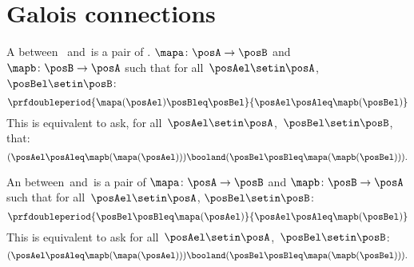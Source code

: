 

\section{Galois connections}\label{subsec:galois-connections}

\begin{ctdefinition}\label{def:monotone-galois-connection}
    A  between ~\posA and~\posB is a pair of .
    $\mapa\colon \posA\to \posB$ and~$\mapb\colon \posB\to \posA$ such that for all~$\posAel\setin \posA$,~$\posBel\setin \posB$:
    \begin{equation}
        \prfdoubleperiod{\mapa(\posAel) \posBleq \posBel}{\posAel \posAleq \mapb(\posBel)}
    \end{equation}
    This is equivalent to ask, for all~$\posAel\setin \posA$,~$\posBel\setin \posB$, that:
    \begin{equation}
        (\posAel\posAleq \mapb(\mapa(\posAel)))
        \booland (\posBel\posBleq \mapa(\mapb(\posBel))).
    \end{equation}
\end{ctdefinition}

\begin{ctdefinition}\label{def:antitone-galois-connection}
    An  between~\posA and~\posB is a pair of  $\mapa\colon \posA\to \posB$ and $\mapb \colon \posB\to \posA$ such that for all~$\posAel\setin \posA$, $\posBel\setin \posB$:
    \begin{equation}
        \prfdoubleperiod{\posBel \posBleq \mapa(\posAel)}{\posAel \posAleq \mapb(\posBel)}
    \end{equation}
    This is equivalent to ask for all~$\posAel\setin \posA$,~$\posBel\setin \posB$:
    \begin{equation}
        (\posAel \posAleq \mapb(\mapa(\posAel)))
        \booland  (\posBel \posBleq \mapa(\mapb(\posBel))).
    \end{equation}
\end{ctdefinition}

